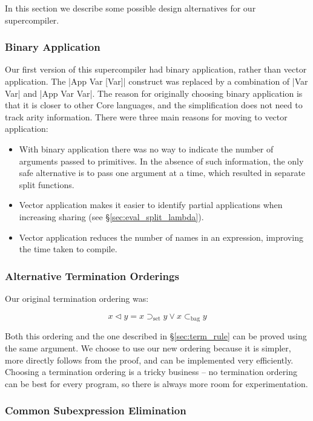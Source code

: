 \documentclass[draft]{sigplanconf}
\newcommand{\setsup}{\supset_{\mathrm{set}}}
\newcommand{\bagsub}{\subset_{\mathrm{bag}}}
\begin{document}
In this section we describe some possible design alternatives for our supercompiler.

\subsubsection{Binary Application}
\label{sec:binaryapp}

Our first version of this supercompiler had binary application, rather than vector application. The |App Var [Var]| construct was replaced by a combination of |Var Var| and |App Var Var|. The reason for originally choosing binary application is that it is closer to other Core languages, and the simplification does not need to track arity information. There were three main reasons for moving to vector application:

\begin{itemize}
\item With binary application there was no way to indicate the number of arguments passed to primitives. In the absence of such information, the only safe alternative is to pass one argument at a time, which resulted in separate split functions.
\item Vector application makes it easier to identify partial applications when increasing sharing (see \S\ref{sec:eval_split_lambda}).
\item Vector application reduces the number of names in an expression, improving the time taken to compile.
\end{itemize}

\subsubsection{Alternative Termination Orderings}

Our original termination ordering was:

\[
x \lhd y = x \setsup y \vee x \bagsub y
\]

Both this ordering and the one described in \S\ref{sec:term_rule} can be proved using the same argument. We choose to use our new ordering because it is simpler, more directly follows from the proof, and can be implemented very efficiently. Choosing a termination ordering is a tricky business -- no termination ordering can be best for every program, so there is always more room for experimentation.

\subsubsection{Common Subexpression Elimination}
\end{document}
